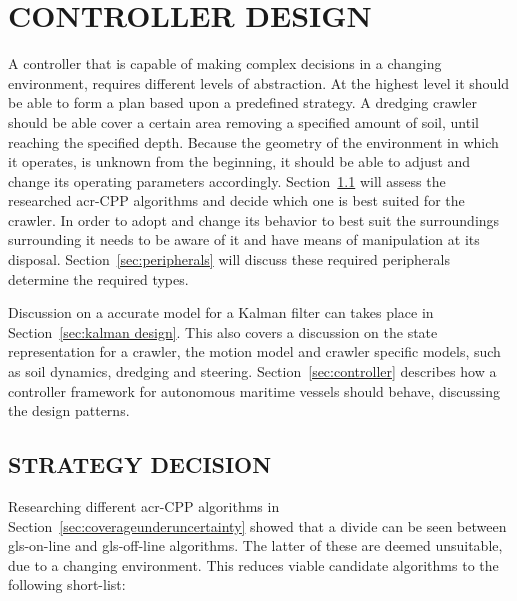 \chapter{CONTROLLER DESIGN}\label{chap:controller design}


A controller that is capable of making complex decisions in a changing environment, requires different levels of
abstraction. At the highest level it should be able to form a plan based upon a predefined strategy. A dredging crawler
should be able cover a certain area removing a specified amount of soil, until reaching the specified depth. Because the
geometry of the environment in which it operates, is unknown from the beginning, it should be able to adjust and change
its operating parameters accordingly. Section~\ref{sec:strategy decision} will assess the researched \gls{acr-CPP}
algorithms and decide which one is best suited for the crawler. In order to adopt and change its behavior to best suit
the surroundings surrounding it needs to be aware of it and have means of manipulation at its disposal.
Section~\ref{sec:peripherals} will discuss these required peripherals determine the required types.

Discussion on a accurate model for a Kalman filter can takes place in Section~\ref{sec:kalman design}. This also covers
a discussion on the state representation for a crawler, the motion model and crawler specific models, such as soil
dynamics, dredging and steering. Section~\ref{sec:controller} describes how a controller framework for autonomous
maritime vessels should behave, discussing the design patterns.

\section{STRATEGY DECISION}\label{sec:strategy decision}

Researching different \gls{acr-CPP} algorithms in Section~\ref{sec:coverageunderuncertainty} showed that a divide can be
seen between \gls{gls-on-line} and \gls{gls-off-line} algorithms. The latter of these are deemed unsuitable, due to a
changing environment. This reduces viable candidate algorithms to the following short-list:


